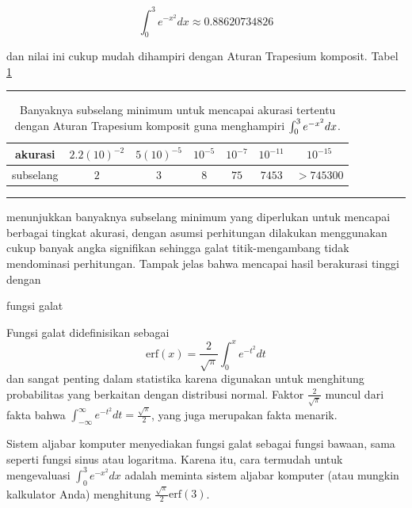 \[
\int_{0}^{3}e^{-x^{2}}dx\approx0.88620734826
\]

\noindent dan nilai ini cukup mudah dihampiri dengan Aturan Trapesium
komposit. Tabel \ref{tab:MinimumTrapezoidal} 
\begin{table}
\hrule 

\caption{\label{tab:MinimumTrapezoidal}Banyaknya subselang minimum untuk mencapai
akurasi tertentu dengan Aturan Trapesium komposit guna menghampiri
$\protect\int_{0}^{3}e^{-x^{2}}dx$.}

\centering{}\medskip{}
\begin{tabular}{c|cccccc}
akurasi & $2.2(10)^{-2}$ & $5(10)^{-5}$ & $10^{-5}$ & $10^{-7}$ & $10^{-11}$ & $10^{-15}$\tabularnewline
\hline 
subselang & $2$ & $3$ & $8$ & $75$ & $7453$ & $>745300$\tabularnewline
\end{tabular}\medskip{}
\hrule 
\end{table}
menunjukkan banyaknya subselang minimum yang diperlukan untuk mencapai
berbagai tingkat akurasi, dengan asumsi perhitungan dilakukan menggunakan
cukup banyak angka signifikan sehingga galat titik-mengambang tidak
mendominasi perhitungan. Tampak jelas bahwa mencapai hasil berakurasi
tinggi dengan \begin{digression}{fungsi galat} 

\noindent Fungsi galat didefinisikan sebagai
\[
\mbox{erf}(x)=\frac{2}{\sqrt{\pi}}\int_{0}^{x}e^{-t^{2}}dt
\]
dan sangat penting dalam statistika karena digunakan untuk menghitung
probabilitas yang berkaitan dengan distribusi normal. Faktor $\frac{2}{\sqrt{\pi}}$
muncul dari fakta bahwa $\int_{-\infty}^{\infty}e^{-t^{2}}dt=\frac{\sqrt{\pi}}{2}$,
yang juga merupakan fakta menarik.

Sistem aljabar komputer menyediakan fungsi galat sebagai fungsi bawaan,
sama seperti fungsi sinus atau logaritma. Karena itu, cara termudah
untuk mengevaluasi $\int_{0}^{3}e^{-x^{2}}dx$ adalah meminta sistem
aljabar komputer (atau mungkin kalkulator Anda) menghitung $\frac{\sqrt{\pi}}{2}\mbox{erf}(3)$.

\noindent\end{digression} 

